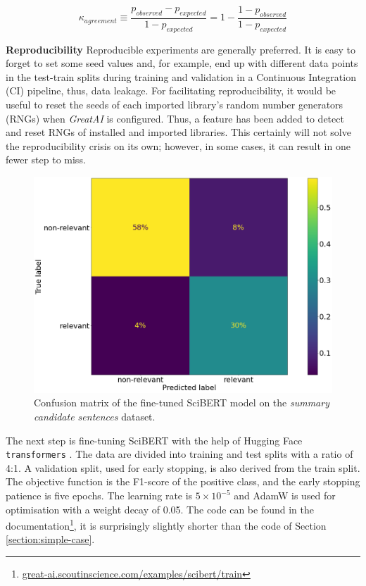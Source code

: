 \begin{equation} \label{equation:kappa}
\kappa_{agreement} \equiv \frac{p_{observed} - p_{expected}}{1 - p_{expected}} = 1 - \frac{1 - p_{observed}}{1 - p_{expected}} 
\end{equation}

\begin{displayquote}
\textbf{Reproducibility} Reproducible experiments are generally preferred. It is easy to forget to set some seed values and, for example, end up with different data points in the test-train splits during training and validation in a Continuous Integration (CI) pipeline, thus, data leakage. For facilitating reproducibility, it would be useful to reset the seeds of each imported library's random number generators (RNGs) when \textit{GreatAI} is configured. Thus, a feature has been added to detect and reset RNGs of installed and imported libraries. This certainly will not solve the reproducibility crisis \cite{hutson2018artificial} on its own; however, in some cases, it can result in one fewer step to miss.
\end{displayquote}

\begin{figure}[h]
    \centering
    \includegraphics[width=0.7\linewidth]{figures/scibert-confusion.png}
    \captionsetup{width=.9\linewidth}
    \caption{Confusion matrix of the fine-tuned SciBERT model on the \textit{summary candidate sentences} dataset.}
    \label{fig:scibert-confusion}
\end{figure}

The next step is fine-tuning SciBERT with the help of Hugging Face \texttt{transformers} \cite{wolf2019huggingface}. The data are divided into training and test splits with a ratio of 4:1. A validation split, used for early stopping, is also derived from the train split. The objective function is the F1-score of the positive class, and the early stopping patience is five epochs. The learning rate is $5 \times 10^{-5}$ and AdamW \cite{loshchilov2017decoupled} is used for optimisation with a weight decay of 0.05. The code can be found in the documentation\footnote{\href{https://great-ai.scoutinscience.com/examples/scibert/train/}{great-ai.scoutinscience.com/examples/scibert/train}}, it is surprisingly slightly shorter than the code of Section \ref{section:simple-case}.

